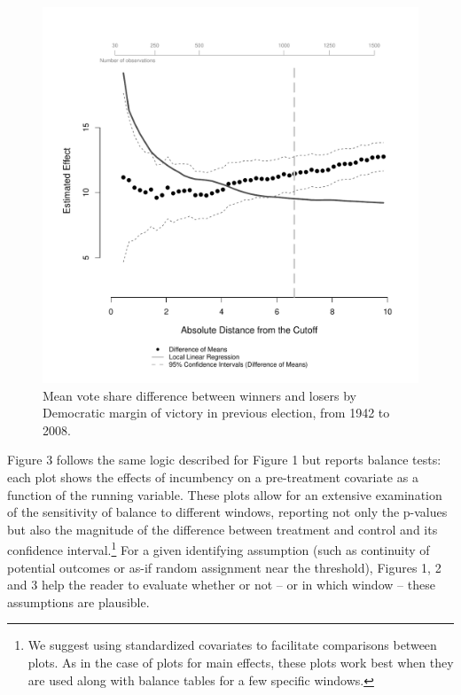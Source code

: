 \documentclass[letterpaper,twoside,12pt]{article}
\begin{document}
\clearpage
\begin{figure}
  \caption{Mean vote share difference between winners and losers by Democratic margin of victory in previous election, from 1942 to 2008.}\label{fig:main_est_add}
\vspace{-1mm}
  \centerline{\includegraphics[width=1\textwidth]{with_add_est_plot.pdf}}
  \end{figure}
\clearpage

Figure 3 follows the same logic described for Figure 1 but reports balance tests: each plot shows the effects of incumbency on a pre-treatment covariate as a function of the running variable. These plots allow for an extensive examination of the sensitivity of balance to different windows, reporting not only the p-values but also the magnitude of the difference between treatment and control and its confidence interval.\footnote{We suggest using standardized covariates to facilitate comparisons between plots. As in the case of plots for main effects, these plots work best when they are used along with balance tables for a few specific windows.} For a given identifying assumption (such as continuity of potential outcomes or as-if random assignment near the threshold), Figures 1, 2 and 3 help the reader to evaluate whether or not -- or in which window -- these assumptions are plausible.
\end{document}
